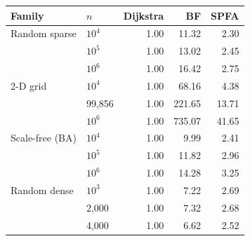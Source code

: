 \begin{tabular}{llrrr}
\toprule
Family & $n$ & Dijkstra & BF & SPFA \\
\midrule
Random sparse & $10^4$ & 1.00 & 11.32 & 2.30 \\
 & $10^5$ & 1.00 & 13.02 & 2.45 \\
 & $10^6$ & 1.00 & 16.42 & 2.75 \\
\midrule
2-D grid & $10^4$ & 1.00 & 68.16 & 4.38 \\
 & 99{,}856 & 1.00 & 221.65 & 13.71 \\
 & $10^6$ & 1.00 & 735.07 & 41.65 \\
\midrule
Scale-free (BA) & $10^4$ & 1.00 & 9.99 & 2.41 \\
 & $10^5$ & 1.00 & 11.82 & 2.96 \\
 & $10^6$ & 1.00 & 14.28 & 3.25 \\
\midrule
Random dense & $10^3$ & 1.00 & 7.22 & 2.69 \\
 & 2{,}000 & 1.00 & 7.32 & 2.68 \\
 & 4{,}000 & 1.00 & 6.62 & 2.52 \\
\bottomrule
\end{tabular}
